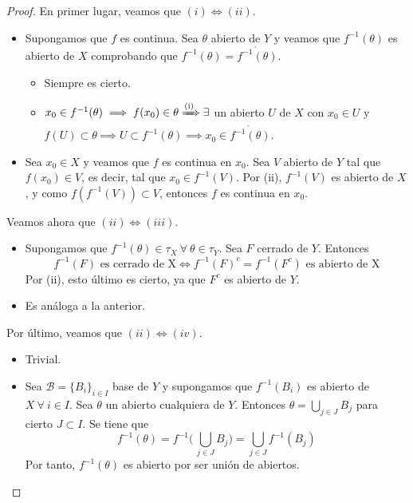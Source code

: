 \documentclass[12pt]{report}
\theoremstyle{definition}
\theoremstyle{definition}
\theoremstyle{remark}
\begin{document}
\begin{proof}
En primer lugar, veamos que $(i) \iff (ii)$.
\begin{itemize}
    \item[{\fbox[rb]{$\Rightarrow$}}] Supongamos que $f$ es continua. Sea $\theta$ abierto de $Y$ y veamos que $f^{-1}(\theta)$ es abierto de $X$ comprobando que $f^{-1}(\theta) = \mathring{f^{-1}(\theta)}$.
        \begin{itemize}
            \item[{\fbox[rb]{$\subset$}}] Siempre es cierto.
            \item[{\fbox[rb]{$\supset$}}] $x_0 \in f^{-1}(\theta) \implies f(x_0) \in \theta \xRightarrow{\text{(i)}} \exists$ un abierto $U$ de $X$ con $x_0 \in U$ y $f(U) \subset \theta \implies U \subset f^{-1}(\theta) \implies x_0 \in \mathring{f^{-1}(\theta)}$.
        \end{itemize}
    \item[{\fbox[rb]{$\Leftarrow$}}] Sea $x_0 \in X$ y veamos que $f$ es continua en $x_0$. Sea $V$ abierto de $Y$ tal que $f(x_0) \in V$, es decir, tal que $x_0 \in f^{-1}(V)$. Por (ii), $f^{-1}(V)$ es abierto de $X$, y como $f(f^{-1}(V)) \subset V$, entonces $f$ es continua en $x_0$.
\end{itemize}

\vspace{2mm}
Veamos ahora que $(ii) \iff (iii)$.
\begin{itemize}
    \item[{\fbox[rb]{$\Rightarrow$}}] Supongamos que $f^{-1}(\theta) \in \tau_X \ \forall \ \theta \in \tau_Y$. Sea $F$ cerrado de $Y$. Entonces \[f^{-1}(F) \textrm{ es cerrado de X} \iff f^{-1}(F)^c = f^{-1}(F^c) \textrm{ es abierto de X}\] Por (ii), esto último es cierto, ya que $F^c$ es abierto de $Y$.  
    \item[{\fbox[rb]{$\Leftarrow$}}] Es análoga a la anterior.
\end{itemize}

\vspace{2mm}
Por último, veamos que $(ii) \iff (iv)$.
 \begin{itemize}
    \item[{\fbox[rb]{$\Rightarrow$}}] Trivial.
    \item[{\fbox[rb]{$\Leftarrow$}}] Sea $\mathcal{B} = \{B_i\}_{i \in I}$ base de $Y$ y supongamos que $f^{-1}(B_i)$ es abierto de $X \ \forall \ i \in I$. Sea $\theta$ un abierto cualquiera de $Y$. Entonces $\theta = \bigcup_{j \in J}B_j$ para cierto $J \subset I$. Se tiene que \[f^{-1}(\theta) = f^{-1}\biggl( \, \bigcup_{j \in J}B_j \biggr) = \bigcup_{j \in J}f^{-1}(B_j)\] Por tanto, $f^{-1}(\theta)$ es abierto por ser unión de abiertos. 
 \end{itemize}
\end{proof}
\end{document}
